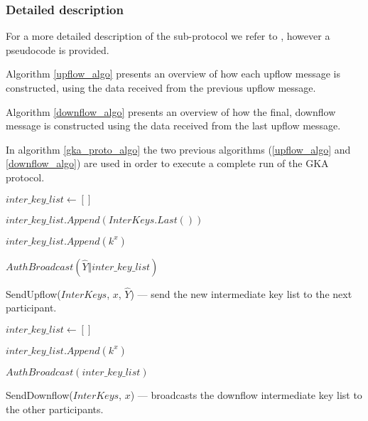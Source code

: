 \subsubsection{Detailed description}
For a more detailed description of the sub-protocol we refer to \cite{mpenc}, however a pseudocode is provided.

Algorithm \ref{upflow_algo} presents an overview of how each upflow message is constructed, using the data received from the previous upflow message.

Algorithm \ref{downflow_algo} presents an overview of how the final, downflow message is constructed using the data received from the last upflow message.

In algorithm \ref{gka_proto_algo} the two previous algorithms (\ref{upflow_algo} and \ref{downflow_algo}) are used in order to execute a complete run of the GKA protocol.
\vfill
\begin{algorithm}[H]
  \Begin
  {
    $inter\_key\_list \leftarrow []$

    $inter\_key\_list.Append(InterKeys.Last() )$

    {
      $inter\_key\_list.Append(k^x)$
    }

    $AuthBroadcast(\hat{Y} \Vert inter\_key\_list)$
  }
  \caption{SendUpflow($InterKeys$, $x$, $\hat{Y}$) --- send the new intermediate key list to the next participant.}
  \label{upflow_algo}
\end{algorithm}
\vfill
\begin{algorithm}[H]
  \Begin
  {
    $inter\_key\_list \leftarrow []$

    {
      $inter\_key\_list.Append(k^x)$
	}

    $AuthBroadcast(inter\_key\_list)$
  }
  \caption{SendDownflow($InterKeys$, $x$) --- broadcasts the downflow intermediate key list to the other participants.}
  \label{downflow_algo}
\end{algorithm}
\vfill
